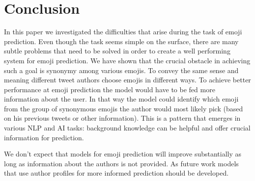 \documentclass[10pt, a4paper]{article}
\begin{document}
\section{Conclusion}

In this paper we investigated the difficulties that arise during the task of 
emoji prediction. Even though the task seems simple on the surface, there are 
many subtle problems that need to be solved in order to create a well performing
system for emoji prediction. We have shown that the crucial obstacle in 
achieving such a goal is synonymy among various emojis. To convey the same sense
and meaning different tweet authors choose emojis in different ways. To achieve 
better performance at emoji prediction the model would have to be fed more 
information about the user. In that way the model could identify which emoji 
from the group of synonymous emojis the author would most likely pick (based on 
his previous tweets or other information). This is a pattern that emerges in 
various NLP and AI tasks: background knowledge can be helpful and offer crucial 
information for prediction.

We don't expect that models for emoji prediction will improve substantially as 
long as information about the authors is not provided. As future work models that 
use author profiles for more informed prediction should be developed.



 
\end{document}

